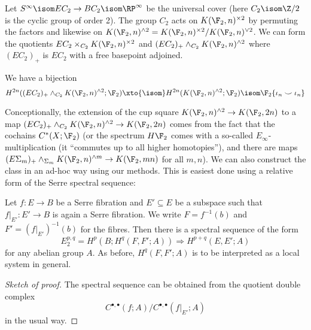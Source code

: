 Let $S^\infty \isom E C_2 \to B C_2 \isom \RP^\infty$ be the universal cover (here $C_2 \isom \Zn{2}$ is the cyclic group of order 2).
The group $C_2$ acts on $K(\F_2, n)^{\times 2}$ by permuting the factors and likewise on $K(\F_2, n)^{\wedge 2} = K(\F_2, n)^{\times 2} / K(\F_2, n)^{\vee 2}$.
We can form the quotients $E C_2 \times_{C_2} K(\F_2, n)^{\times 2}$ and $(E C_2)_{+} \wedge_{C_2} K(\F_2, n)^{\wedge 2}$ where $(E C_2)_{+}$ is $E C_2$ with a free basepoint adjoined.
\begin{proposition}
	We have a bijection
	\begin{equation*}
		H^{2n}((E C_2)_{+} \wedge_{C_2} K(\F_2, n)^{\wedge 2}; \F_2) \xto{\isom} H^{2n}(K(\F_2, n)^{\wedge 2}; \F_2) \isom \F_2\{\iota_n \smile \iota_n\}
	\end{equation*}
\end{proposition}
Conceptionally, the extension of the cup square $K(\F_2, n)^{\wedge 2} \to K(\F_2, 2n)$ to a map $(E C_2)_{+} \wedge_{C_2} K(\F_2, n)^{\wedge 2} \to K(\F_2, 2n)$ comes from the fact that the cochains $C^*(X; \F_2)$ (or the spectrum $H \F_2$ comes with a so-called $E_\infty$-multiplication (it \enquote{commutes up to all higher homotopies}), and there are maps $(E \Sigma_m)_{+} \wedge_{\Sigma_m} K(\F_2, n)^{\wedge m} \to K(\F_2, m n)$ for all $m, n$).
We can also construct the class in an ad-hoc way using our methods.
This is easiest done using a relative form of the Serre spectral sequence:
\begin{proposition}\label{prop:relserrespecseq}
	Let $f\colon E \to B$ be a Serre fibration and $E' \subseteq E$ be a subspace such that $f|_{E'}\colon E' \to B$ is again a Serre fibration.
	We write $F = f^{-1}(b)$ and $F' = (f|_{E'})^{-1}(b)$ for the fibres.
	Then there is a spectral sequence of the form
	\begin{equation*}
		E_2^{p, q} = H^p(B; H^q(F, F'; A)) \Rightarrow H^{p + q}(E, E'; A)
	\end{equation*}
	for any abelian group $A$.
	As before, $H^q(F, F'; A)$ is to be interpreted as a local system in general.
\end{proposition}
\begin{proof}[Sketch of proof]
	The spectral sequence can be obtained from the quotient double complex
	\begin{equation*}
		C^{\bullet, \bullet}(f; A) / C^{\bullet, \bullet}(f|_{E'}; A)
	\end{equation*}
	in the usual way.
\end{proof}

